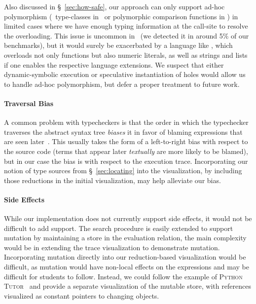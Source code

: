 Also discussed in \S~\ref{sec:how-safe}, our approach can only support
ad-hoc polymorphism (\eg\ type-classes in \haskell\ or polymorphic
comparison functions in \ocaml) in limited cases where we have enough
typing information at the call-site to resolve the overloading. This
issue is uncommon in \ocaml\ (we detected it in around 5\% of our
benchmarks), but it would surely be exacerbated by a language like
\haskell, which overloads not only functions but also numeric literals,
as well as strings and lists if one enables the respective language
extensions.
%
We suspect that either dynamic-symbolic execution or speculative
instantiation of holes would allow us to handle ad-hoc polymorphism, but
defer a proper treatment to future work.

\paragraph{Traversal Bias}

A common problem with typecheckers is that the order in which the
typechecker traverses the abstract syntax tree \emph{biases} it in favor
of blaming expressions that are seen later~\cite{McAdam1998-ub}. This
usually takes the form of a left-to-right bias with respect to the
source code (terms that appear later \emph{textually} are more likely to
be blamed), but in our case the bias is with respect to the execution
trace. Incorporating our notion of type sources from
\S~\ref{sec:locating} into the visualization, \eg by including those
reductions in the initial visualization, may help alleviate our bias.



\paragraph{Side Effects}

While our implementation does not currently support side effects, it
would not be difficult to add support.
%
The search procedure is easily extended to support mutation by
maintaining a store in the evaluation relation, the main complexity
would be in extending the trace visualization to demonstrate mutation.
%
Incorporating mutation directly into our reduction-based visualization
would be difficult, as mutation would have non-local effects on the
expressions and may be difficult for students to follow.
%
Instead, we could follow the example of
%
\textsc{Python Tutor}~\cite{GuoSIGCSE2013}
%
and provide a separate visualization of the mutable store, with references
visualized as constant pointers to changing objects.





